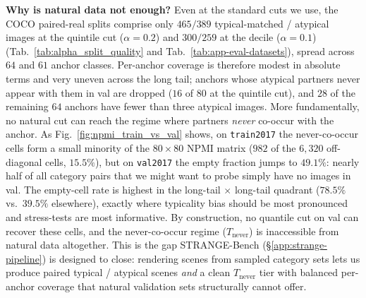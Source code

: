 \begin{table}[h]
\centering
\small
\caption{\textbf{$\alpha$-sweep on Co-DINO R-50 on COCO val
paired-real, full-annotation mAP gap (\%).} Per-cut typicality gap
$\Delta^{\text{T-A}}$ across five $\alpha$ cuts and the per-row mean
$\overline{\Delta}$ for each augmentation. The gap is non-zero
under every configuration at every cut; standard augmentation does
not reduce the gap relative to no-aug. Co-DINO R-50 trained for 12 epochs at the base LR and one fine-tuning epoch at $0.1\times$ LR. The SCP row is the submission's SCP run, not the SCP row of Tab.~\ref{tab:codino_main}; re-evaluating these checkpoints changes the quintile and decile gaps by at most 0.2.}
\label{tab:alpha_sweep_codino}
\setlength{\tabcolsep}{4pt}

\end{table}

\FloatBarrier
\noindent\textbf{Why is natural data not enough?}
Even at the standard cuts we use, the COCO paired-real splits comprise only $465 / 389$ typical-matched / atypical images at the quintile cut ($\alpha = 0.2$) and $300 / 259$ at the decile ($\alpha = 0.1$) (Tab.~\ref{tab:alpha_split_quality} and Tab.~\ref{tab:app-eval-datasets}), spread across $64$ and $61$ anchor classes. Per-anchor coverage is therefore modest in absolute terms and very uneven across the long tail; anchors whose atypical partners never appear with them in val are dropped ($16$ of $80$ at the quintile cut), and $28$ of the remaining $64$ anchors have fewer than three atypical images. More fundamentally, no natural cut can reach the regime where partners \emph{never} co-occur with the anchor. As Fig.~\ref{fig:npmi_train_vs_val} shows, on \texttt{train2017} the never-co-occur cells form a small minority of the $80 \times 80$ NPMI matrix ($982$ of the $6{,}320$ off-diagonal cells, $15.5\%$), but on \texttt{val2017} the empty fraction jumps to $49.1\%$: nearly half of all category pairs that we might want to probe simply have no images in val. The empty-cell rate is highest in the long-tail $\times$ long-tail quadrant ($78.5\%$ vs.\ $39.5\%$ elsewhere), exactly where typicality bias should be most pronounced and stress-tests are most informative. By construction, no quantile cut on val can recover these cells, and the never-co-occur regime ($T_{\text{never}}$) is inaccessible from natural data altogether. This is the gap STRANGE-Bench (\S\ref{app:strange-pipeline}) is designed to close: rendering scenes from sampled category sets lets us produce paired typical / atypical scenes \emph{and} a clean $T_{\text{never}}$ tier with balanced per-anchor coverage that natural validation sets structurally cannot offer. 
